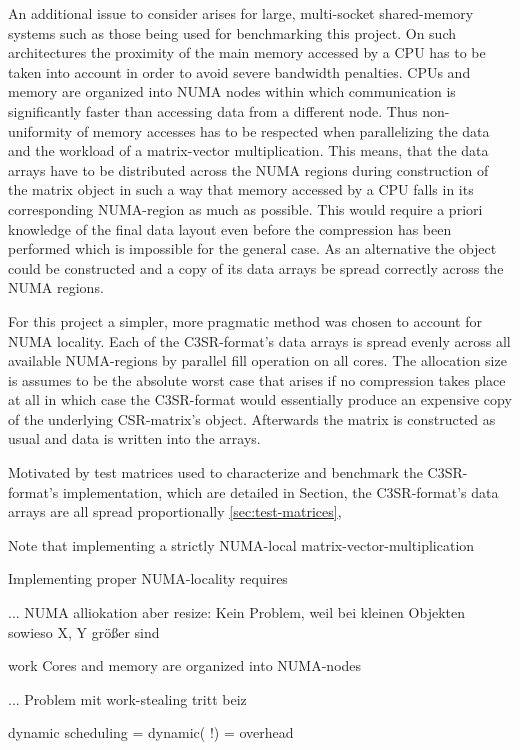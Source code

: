     An additional issue to consider arises for large, multi-socket shared-memory systems such as those being used for
    benchmarking this project. On such architectures the proximity of the main memory accessed by a CPU has to be taken
    into account in order to avoid severe bandwidth penalties. CPUs and memory are organized into NUMA nodes within
    which communication is significantly faster than accessing data from a different node. Thus non-uniformity of memory
    accesses has to be respected when parallelizing the data and the workload of a matrix-vector multiplication. This
    means, that the data arrays have to be distributed across the NUMA regions during construction of the matrix object
    in such a way that memory accessed by a CPU falls in its corresponding NUMA-region as much as possible. This
    would require a priori knowledge of the final data layout even before the compression has been performed which is
    impossible for the general case. As an alternative the object could be constructed and a copy of its data arrays be
    spread correctly across the NUMA regions.

    For this project a simpler, more pragmatic method was chosen to account for NUMA locality. Each of the C3SR-format's
    data arrays is spread evenly across all available NUMA-regions by parallel fill operation on all cores. The
    allocation size is assumes to be the absolute worst case that arises if no compression takes place at all in which
    case the C3SR-format would essentially produce an expensive copy of the underlying CSR-matrix's object. Afterwards
    the matrix is constructed as usual and data is written into the arrays.

    Motivated by test matrices
    used to characterize and benchmark the C3SR-format's implementation, which are detailed in Section, the
    C3SR-format's data arrays are all spread proportionally
    \ref{sec:test-matrices},

    Note that implementing a strictly NUMA-local matrix-vector-multiplication


    Implementing proper NUMA-locality requires 


    ... NUMA alliokation aber resize: Kein Problem, weil bei kleinen Objekten sowieso X, Y größer sind

    work Cores and memory are organized into NUMA-nodes

    ... Problem mit work-stealing tritt beiz  

    dynamic scheduling  = dynamic( !) = overhead

